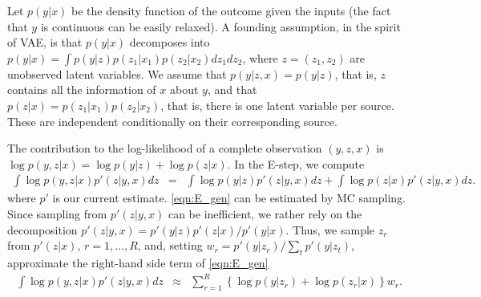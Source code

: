 \documentclass{article}
\begin{document}

Let $p(y|x)$ be the density function of the outcome given the inputs (the fact that $y$ is continuous can be easily relaxed). A founding assumption, in the spirit of VAE, is that $p(y|x)$ decomposes into  $p(y|x)=\int p(y|z) p(z_1|x_1) p(z_2|x_2)dz_1dz_2$, where $z=(z_1,z_2)$ are unobserved latent variables. We assume that $p(y|z,x)=p(y|z)$, that is, $z$ contains all the information of $x$ about $y$, and that $p(z|x)=p(z_1|x_1)p(z_2|x_2)$, that is, there is one latent variable per source. These are independent conditionally on their corresponding source.

The contribution to the log-likelihood of a complete observation $(y, z, x)$ is
$\log p(y , z| x) = \log p(y | z) + \log p(z| x)$. In the E-step, we compute
\begin{eqnarray}
\label{eqn:E_gen}
\int \log p(y , z| x) p'(z | y, x) dz &=& \int \log p(y | z) p'(z|y, x) dz + \int \log p(z| x) p'(z|y, x) dz.
\end{eqnarray}
where $p'$ is our current estimate. \autoref{eqn:E_gen} can be estimated by MC sampling. Since sampling from $p'(z|y, x)$ can be inefficient, we rather rely on the decomposition $p'(z|y, x) = p'(y|z) p'(z|x)/p'(y|x)$. Thus, we sample $z_r$ from $p'(z|x)$, $r=1,\ldots,R$, and, setting $w_r=p'(y|z_r)/\sum_{t} p'(y|z_{t})$, approximate the right-hand side term of \autoref{eqn:E_gen}
\begin{eqnarray}
\label{eqn:E_MC_gen}
\int \log p(y , z| x) p'(z|y, x) dz &\approx& \sum_{r=1}^R \left\{\log p(y | z_r) + \log p(z_r| x)\right\} w_r.
\end{eqnarray}
\end{document}
